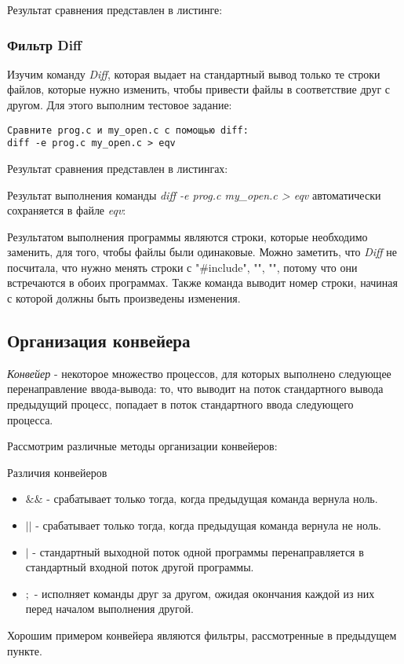 \documentclass[14pt,a4paper,report]{report}
\begin{document}
Результат сравнения представлен в листинге:



\subsubsection{Фильтр Diff}

Изучим команду \emph{Diff}, которая выдает на стандартный вывод только те строки файлов, которые нужно изменить, чтобы привести файлы в соответствие друг с другом. Для этого выполним тестовое задание:

\begin{verbatim}
Сравните prog.c и my_open.c с помощью diff:
diff -e prog.c my_open.c > eqv
\end{verbatim}

Результат сравнения представлен в листингах:



Результат выполнения команды \emph{diff -e prog.c my\_open.c > eqv} автоматически сохраняется в файле \emph{eqv}:



Результатом выполнения программы являются строки, которые необходимо заменить, для того, чтобы файлы были одинаковые. Можно заметить, что \emph{Diff} не посчитала, что нужно менять строки с "\#include", "{", "}", потому что они встречаются в обоих программах. Также команда выводит номер строки, начиная с которой должны быть произведены изменения.

\subsection{Организация конвейера}

\emph{Конвейер} - некоторое множество процессов, для которых выполнено следующее перенаправление ввода-вывода: то, что выводит на поток стандартного вывода предыдущий процесс, попадает в поток стандартного ввода следующего процесса.

Рассмотрим различные методы организации конвейеров:



Различия конвейеров

\begin{itemize}
	\item $\&\&$ - срабатывает только тогда, когда предыдущая команда вернула ноль.
	\item $||$ - срабатывает только тогда, когда предыдущая команда вернула не ноль.
	\item $|$ - стандартный выходной поток одной программы перенаправляется в стандартный входной поток другой программы.
	\item $;$ - исполняет команды друг за другом, ожидая окончания каждой из них перед началом выполнения другой.
\end{itemize}

Хорошим примером конвейера являются фильтры, рассмотренные в предыдущем пункте.
\end{document}
